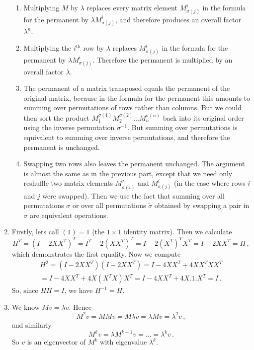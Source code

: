 \begin{enumerate}
\begin{enumerate}
\item Multiplying $M$ by $\lambda$ replaces every matrix element $M^i_{\sigma(j)}$ in the formula for the permanent
by $\lambda M^i_{\sigma(j)}$, and therefore produces an overall factor $\lambda^n$.
\item Multiplying the $i^{\text{th}}$ row by $\lambda$ replaces $M^i_{\sigma(j)}$ in the formula for the permanent
by $\lambda M^i_{\sigma(j)}$. Therefore the permanent is multiplied by an overall factor $\lambda$.
\item The permanent of a matrix transposed equals the permanent of the original matrix, because
in the formula for the permanent this amounts to summing over permutations of rows rather than columns. But we could
then sort the product $M^{\sigma(1)}_1 M^{\sigma(2)}_2\ldots M^{\sigma(n)}_n$ back into its original order using the inverse permutation
 $\sigma^{-1}$. But summing over permutations is equivalent to summing over inverse permutations, and therefore the permanent is unchanged.
\item Swapping two rows also leaves the permanent unchanged. The argument is almost the same as in the previous part, except 
that we need only reshuffle two matrix elements $M^j_{\sigma(i)}$ and $M^i_{\sigma(j)}$ (in the case where rows $i$ and $j$ were swapped).
Then we use the fact that summing over all permutations $\sigma$ or over all permutations $\widetilde \sigma$ obtained
by swapping a pair in $\sigma$ are equivalent operations.
\end{enumerate}

\item Firstly, lets call $(1)=1$ (the $1\times 1$ identity matrix). Then we calculate
\[
H^T=(I-2 X X^T)^T = I^T -2 (X X^T)^T = I -2 (X^T)^T X^T = I - 2 X X^T = H\, ,
\]
which demonstrates the first equality. Now we compute
\begin{gather*}
H^2 = (I-2 X X^T) (I - 2 X X^T) = I - 4 X X^T + 4 X X^T X X^T \\= I - 4 X X^T + 4 X (X^T X) X^T = I - 4 X X^T + 4 X.  1  .X^T = I\, .
\end{gather*}
So, since $HH=I$, we have $H^{-1}=H$.

\item We know $Mv=\lambda v$. Hence 
\[
M^2 v = M M v = M \lambda v = \lambda M v = \lambda^2 v\, , 
\]
and similarly
\[
M^k v = \lambda M^{k-1} v = \ldots = \lambda^k v \, .
\]
So $v$ is an eigenvector of $M^k$ with eigenvalue $\lambda^k$.


\end{enumerate}

